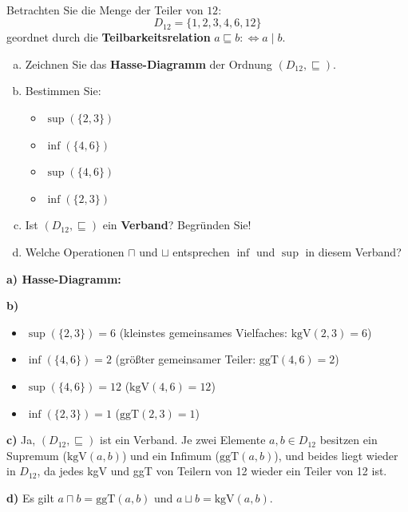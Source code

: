 \\
Betrachten Sie die Menge der Teiler von $12$:
\[
  D_{12} = \{1, 2, 3, 4, 6, 12\}
\]
geordnet durch die \textbf{Teilbarkeitsrelation} $a \sqsubseteq b :\Leftrightarrow a \mid b$.

\begin{enumerate}[a)]
  \item Zeichnen Sie das \textbf{Hasse-Diagramm} der Ordnung $(D_{12}, \sqsubseteq)$.
  \item Bestimmen Sie:
  \begin{itemize}
    \item $\sup(\{2, 3\})$
    \item $\inf(\{4, 6\})$
    \item $\sup(\{4, 6\})$
    \item $\inf(\{2, 3\})$
  \end{itemize}
  \item Ist $(D_{12}, \sqsubseteq)$ ein \textbf{Verband}? Begründen Sie!
  \item Welche Operationen $\sqcap$ und $\sqcup$ entsprechen $\inf$ und $\sup$ in diesem Verband?
\end{enumerate}

\begin{loesung}
\textbf{a) Hasse-Diagramm:}

\begin{center}
\end{center}

\textbf{b)}
\begin{itemize}
  \item $\sup(\{2,3\}) = 6$ \;(kleinstes gemeinsames Vielfaches: $\text{kgV}(2,3)=6$)
  \item $\inf(\{4,6\}) = 2$ \;(größter gemeinsamer Teiler: $\text{ggT}(4,6)=2$)
  \item $\sup(\{4,6\}) = 12$ \;($\text{kgV}(4,6)=12$)
  \item $\inf(\{2,3\}) = 1$ \;($\text{ggT}(2,3)=1$)
\end{itemize}

\textbf{c)} Ja, $(D_{12},\sqsubseteq)$ ist ein Verband. Je zwei Elemente $a,b\in D_{12}$ besitzen ein Supremum ($\text{kgV}(a,b)$) und ein Infimum ($\text{ggT}(a,b)$), und beides liegt wieder in $D_{12}$, da jedes kgV und ggT von Teilern von 12 wieder ein Teiler von 12 ist.

\textbf{d)} Es gilt $a\sqcap b = \text{ggT}(a,b)$ und $a\sqcup b = \text{kgV}(a,b)$.
\end{loesung}

